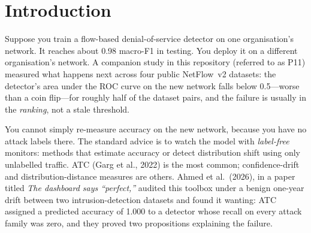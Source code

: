 \documentclass[11pt]{article}
\begin{document}
\section{Introduction}
Suppose you train a flow-based denial-of-service detector on one organisation's network. It reaches about 0.98 macro-F1 in testing. You deploy it on a different organisation's network. A companion study in this repository (referred to as P11) measured what happens next across four public NetFlow~v2 datasets: the detector's area under the ROC curve on the new network falls below 0.5---worse than a coin flip---for roughly half of the dataset pairs, and the failure is usually in the \emph{ranking}, not a stale threshold.

You cannot simply re-measure accuracy on the new network, because you have no attack labels there. The standard advice is to watch the model with \emph{label-free} monitors: methods that estimate accuracy or detect distribution shift using only unlabelled traffic. ATC (Garg et al., 2022) is the most common; confidence-drift and distribution-distance measures are others. Ahmed et al.\ (2026), in a paper titled \emph{The dashboard says ``perfect,''} audited this toolbox under a benign one-year drift between two intrusion-detection datasets and found it wanting: ATC assigned a predicted accuracy of 1.000 to a detector whose recall on every attack family was zero, and they proved two propositions explaining the failure.
\end{document}
